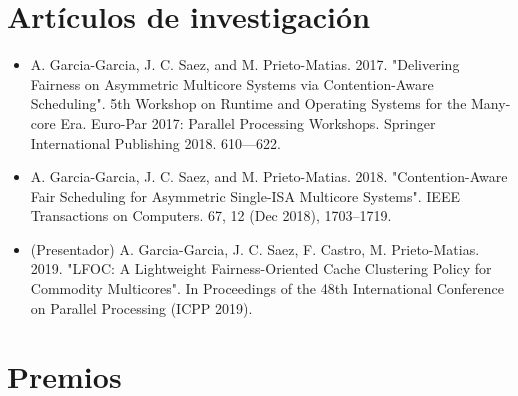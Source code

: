 \documentclass[10pt,a4paper,sans]{moderncv}        %
\begin{document}
\section{Artículos de investigación}
\begin{itemize}
\item A. Garcia-Garcia, J. C. Saez, and M. Prieto-Matias. 2017. "Delivering Fairness on Asymmetric Multicore Systems via Contention-Aware Scheduling". 5th Workshop on Runtime and Operating Systems for the Many-core Era. Euro-Par 2017: Parallel Processing Workshops. Springer International Publishing 2018. 610—622.
\smallskip
\item A. Garcia-Garcia, J. C. Saez, and M. Prieto-Matias. 2018. "Contention-Aware Fair Scheduling for Asymmetric Single-ISA Multicore Systems". IEEE Transactions on Computers. 67, 12 (Dec 2018), 1703–1719.
\smallskip
\item (Presentador) A. Garcia-Garcia, J. C. Saez, F. Castro, M. Prieto-Matias. 2019. "LFOC: A Lightweight Fairness-Oriented Cache Clustering Policy for Commodity Multicores". In Proceedings of the 48th International Conference on Parallel Processing (ICPP 2019).
\end{itemize}

\section{Premios}
\end{document}
